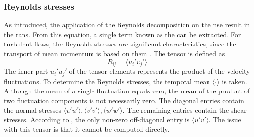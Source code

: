 \subsubsection{Reynolds stresses}

As introduced, the application of the Reynolds decomposition on the \acrshort{nse} result in the \acrshort{rans}.
From this equation, a single term known as the  can be extracted.
For turbulent flows, the Reynolds stresses are significant characteristics, since the transport of mean momentum is based on them \citep{moin_fundamentals_2024}. 
The tensor is defined as 
\begin{equation}
    R_{ij} = \langle u_i' u_j'\rangle
\end{equation}
The inner part $u_i' u_j'$ of the tensor elements represents the product of the velocity fluctuations.
To determine the Reynolds stresses, the temporal mean $\langle \cdot \rangle$ is taken.
Although the mean of a single fluctuation equals zero, the mean of the product of two fluctuation components is not necessarily zero. 
The diagonal entries contain the normal stresses $\langle u' u'\rangle, \langle v' v'\rangle, \langle w' w'\rangle$.
The remaining entries contain the shear stresses.
According to \citep{schlichting_boundary-layer_2017}, the only non-zero off-diagonal entry is $\langle u' v'\rangle$.
The issue with this tensor is that it cannot be computed directly.
%

